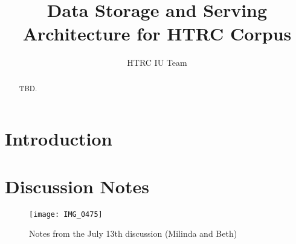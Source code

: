 \documentclass{thesis}
\title{Data Storage and Serving Architecture for HTRC Corpus}
\author{HTRC IU Team}
\begin{document}
\maketitle

\tableofcontents

\begin{abstract}
TBD.
\end{abstract}

\section{Introduction}

\section{Discussion Notes}

\begin{figure}[tb]
    \centering
    \texttt{[image: IMG\_0475]}
    \caption{Notes from the July 13th discussion (Milinda and Beth)}
    \label{fig:notes}
\end{figure}




\end{document}
